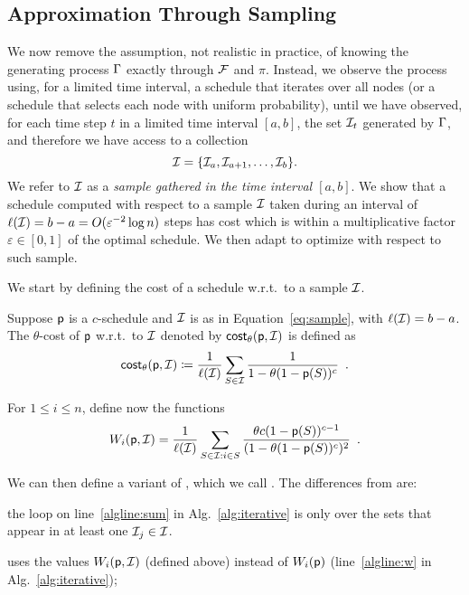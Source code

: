 \subsection{Approximation Through Sampling}\label{sec:sampcomp}
We now remove the assumption, not realistic in practice, of knowing the
generating process $\Gamma$ exactly through $\mathcal{F}$ and $\pi$. Instead, we
observe the process using, for a limited time interval, a schedule that iterates
over all nodes (or a schedule that selects each node with uniform probability),
until we have observed, for each time step $t$ in a limited time interval
$[a,b]$, the set $\mathcal{I}_t$ generated by $\Gamma$, and therefore we have access
to a collection
\begin{equation}\label{eq:sample}
	\mathcal{I}=\{\mathcal{I}_a,\mathcal{I}_{a+1},\dotsc,\mathcal{I}_b\}.
\end{equation}
We refer to $\mathcal{I}$ as a \emph{sample gathered in the time interval
$[a,b]$}. We show that a schedule computed with respect to a sample $\mathcal{I}$ taken during an interval of
$ \ell (\mathcal{I}) = b-a=O(\varepsilon^{-2}\log n)$ steps has cost which is within  a
multiplicative factor $\varepsilon\in[0,1]$ of the optimal schedule. We then adapt \algoname to optimize with respect to such sample.


We start by defining the cost of a schedule w.r.t.~to a sample $\mathcal{I}$.

\begin{definition}\label{def:costsample}
	Suppose $\mathsf{p}$ is a $c$-schedule and $\mathcal{I}$ is as in Equation~\eqref{eq:sample},
	with $\ell (\mathcal{I}) = b-a$. The $\theta$-cost of $\mathsf{p}$ w.r.t.~to $\mathcal{I}$
	denoted by $\mathsf{cost}_\theta(\mathsf{p},\mathcal{I})$ is defined as
	\[
		\mathsf{cost}_\theta(\mathsf{p},\mathcal{I})\coloneqq\frac{1}{\ell(\mathcal{I})}\sum_{S\in \mathcal{I}}
		\frac{1}{1-\theta(1-\mathsf{p}(S))^c}\enspace.
	\]
\end{definition}

For $1\le i\le n$, define now the functions
\[
	W_i(\mathsf{p},\mathcal{I}) = \frac{1}{\ell(\mathcal{I})}\sum_{S\in \mathcal{I}: i\in S}
	\frac{\theta c (1-\mathsf{p}(S))^{c-1}}{(1-\theta(1-\mathsf{p}(S))^c)^2}\enspace.
\]

We can then define a variant of \algoname, which we call \algonameapx. The
differences from \algoname are:
\begin{enumerate*}
	\item the loop on line~\ref{algline:sum} in Alg.~\ref{alg:iterative} is only
		over the sets that appear in at least one $\mathcal{I}_j\in\mathcal{I}$.
	\item \algonameapx uses the values $W_i(\mathsf{p},\mathcal{I})$ (defined above) instead of
		$W_i(\mathsf{p})$ (line~\ref{algline:w} in Alg.~\ref{alg:iterative});
\end{enumerate*}

